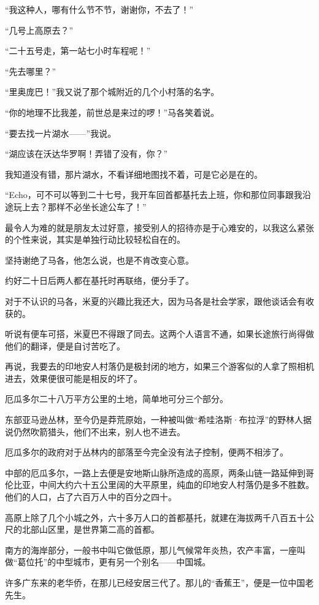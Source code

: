 \par “我这种人，哪有什么节不节，谢谢你，不去了！”
\par “几号上高原去？”
\par “二十五号走，第一站七小时车程呢！”
\par “先去哪里？”
\par “里奥庞巴！”我又说了那个城附近的几个小村落的名字。
\par “你的地理不比我差，前世总是来过的啰！”马各笑着说。
\par “要去找一片湖水——”我说。
\par “湖应该在沃达华罗啊！弄错了没有，你？”
\par 我知道没有错，那片湖水，不看详细地图找不着，可是它必是在的。
\par “Echo，可不可以等到二十七号，我开车回首都基托去上班，你和那位同事跟我沿途玩上去？那样不必坐长途公车了！”
\par 最令人为难的就是朋友太过好意，接受别人的招待亦是于心难安的，以我这么紧张的个性来说，其实是单独行动比较轻松自在的。
\par 坚持谢绝了马各，他怎么说，也是不肯改变心意。
\par 约好二十日后两人都在基托时再联络，便分手了。
\par 对于不认识的马各，米夏的兴趣比我还大，因为马各是社会学家，跟他谈话会有收获的。
\par 听说有便车可搭，米夏巴不得跟了同去。这两个人语言不通，如果长途旅行尚得做他们的翻译，便是自讨苦吃了。
\par 再说，我要去的印地安人村落仍是极封闭的地方，如果三个游客似的人拿了照相机进去，效果便很可能是相反的坏了。
\par 厄瓜多尔二十八万平方公里的土地，简单地可分三个部分。
\par 东部亚马逊丛林，至今仍是莽荒原始，一种被叫做“希哇洛斯·布拉浮”的野林人据说仍然吹箭猎头，他们不出来，别人也不进去。
\par 厄瓜多尔的政府对于丛林内的部落至今完全没有法子控制，便两不相涉了。
\par 中部的厄瓜多尔，一路上去便是安地斯山脉所造成的高原，两条山链一路延伸到哥伦比亚，中间大约六十五公里阔的大平原里，纯血的印地安人村落仍是多不胜数。他们的人口，占了六百万人中的百分之四十。
\par 高原上除了几个小城之外，六十多万人口的首都基托，就建在海拔两千八百五十公尺的北部山区里，是世界第二高的首都。
\par 南方的海岸部分，一般书中叫它做低原，那儿气候常年炎热，农产丰富，一座叫做“葛位托”的中型城市，更有另一个别名——中国城。
\par 许多广东来的老华侨，在那儿已经安居三代了。那儿的“香蕉王”，便是一位中国老先生。
